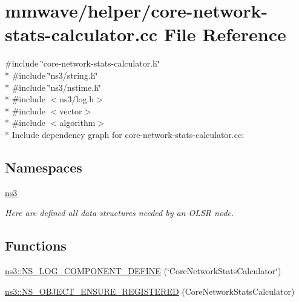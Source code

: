 \hypertarget{core-network-stats-calculator_8cc}{}\section{mmwave/helper/core-\/network-\/stats-\/calculator.cc File Reference}
\label{core-network-stats-calculator_8cc}
{\ttfamily \#include \char`\"{}core-\/network-\/stats-\/calculator.\+h\char`\"{}}\\*
{\ttfamily \#include \char`\"{}ns3/string.\+h\char`\"{}}\\*
{\ttfamily \#include \char`\"{}ns3/nstime.\+h\char`\"{}}\\*
{\ttfamily \#include $<$ns3/log.\+h$>$}\\*
{\ttfamily \#include $<$vector$>$}\\*
{\ttfamily \#include $<$algorithm$>$}\\*
Include dependency graph for core-\/network-\/stats-\/calculator.cc\+:
\subsection*{Namespaces}
\begin{DoxyCompactItemize}
\item 
 \hyperlink{namespacens3}{ns3}
\begin{DoxyCompactList}\small\item\em Here are defined all data structures needed by an O\+L\+SR node. \end{DoxyCompactList}\end{DoxyCompactItemize}
\subsection*{Functions}
\begin{DoxyCompactItemize}
\item 
\hyperlink{namespacens3_acfb56cc8bac87d5e9afd1332c70e0b5c}{ns3\+::\+N\+S\+\_\+\+L\+O\+G\+\_\+\+C\+O\+M\+P\+O\+N\+E\+N\+T\+\_\+\+D\+E\+F\+I\+NE} (\char`\"{}Core\+Network\+Stats\+Calculator\char`\"{})
\item 
\hyperlink{namespacens3_aea03a5a99765263c2906b53300a8d17c}{ns3\+::\+N\+S\+\_\+\+O\+B\+J\+E\+C\+T\+\_\+\+E\+N\+S\+U\+R\+E\+\_\+\+R\+E\+G\+I\+S\+T\+E\+R\+ED} (Core\+Network\+Stats\+Calculator)
\end{DoxyCompactItemize}
